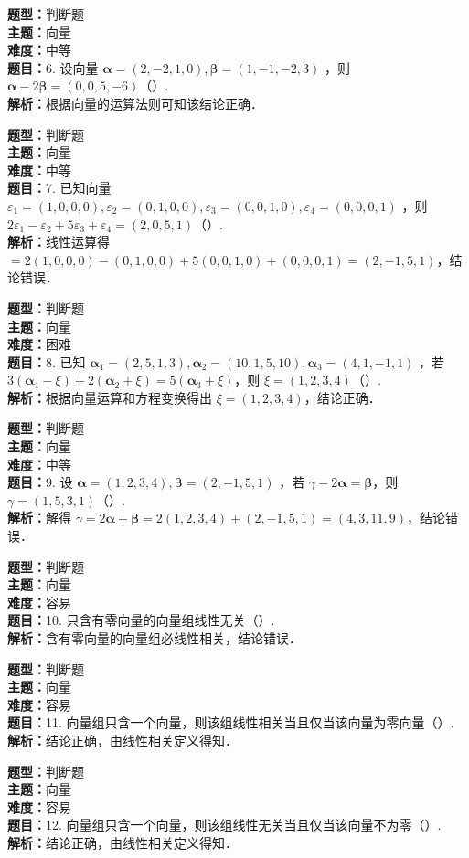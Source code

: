 \documentclass{ctexart}
\newenvironment{question}[5]{%
	\noindent\textbf{题型：}#1\\
	\textbf{主题：}#2\\
	\textbf{难度：}#3\\
	\textbf{题目：}#4\\
	\textbf{解析：}#5\\
	\vspace{1em}
}{}
\begin{document}
	\begin{question}
		{判断题}
		{向量}
		{中等}
		{6. 设向量 \(\boldsymbol{\alpha}=(2,-2,1,0), \boldsymbol{\beta}=(1,-1,-2,3)\) ，则 \(\boldsymbol{\alpha}-2 \boldsymbol{\beta}=(0,0,5,-6)\)（）. }
		{根据向量的运算法则可知该结论正确．}
	\end{question}
	
	\begin{question}
		{判断题}
		{向量}
		{中等}
		{7. 已知向量 \(\varepsilon_1=(1,0,0,0), \varepsilon_2=(0,1,0,0), \varepsilon_3=(0,0,1,0), \varepsilon_4=(0,0,0,1)\) ，则 \(2\varepsilon_1-\varepsilon_2+5\varepsilon_3+\varepsilon_4=(2,0,5,1)\)（）. }
		{线性运算得 \(=2(1,0,0,0)-(0,1,0,0)+5(0,0,1,0)+(0,0,0,1)=(2,-1,5,1)\)，结论错误．}
	\end{question}
	
	\begin{question}
		{判断题}
		{向量}
		{困难}
		{8. 已知 \(\boldsymbol{\alpha}_1=(2,5,1,3), \boldsymbol{\alpha}_2=(10,1,5,10), \boldsymbol{\alpha}_3=(4,1,-1,1)\) ，若 \(3(\boldsymbol{\alpha}_1-\xi)+2(\boldsymbol{\alpha}_2+\xi)=5(\boldsymbol{\alpha}_3+\xi)\)，则 \(\xi=(1,2,3,4)\)（）. }
		{根据向量运算和方程变换得出 \(\xi=(1,2,3,4)\)，结论正确．}
	\end{question}
	
	\begin{question}
		{判断题}
		{向量}
		{中等}
		{9. 设 \(\boldsymbol{\alpha}=(1,2,3,4), \boldsymbol{\beta}=(2,-1,5,1)\) ，若 \(\gamma-2\boldsymbol{\alpha}=\boldsymbol{\beta}\)，则 \(\gamma=(1,5,3,1)\)（）. }
		{解得 \(\gamma=2\boldsymbol{\alpha}+\boldsymbol{\beta}=2(1,2,3,4)+(2,-1,5,1)=(4,3,11,9)\)，结论错误．}
	\end{question}
	
	\begin{question}
		{判断题}
		{向量}
		{容易}
		{10. 只含有零向量的向量组线性无关（）. }
		{含有零向量的向量组必线性相关，结论错误．}
	\end{question}
	
	\begin{question}
		{判断题}
		{向量}
		{容易}
		{11. 向量组只含一个向量，则该组线性相关当且仅当该向量为零向量（）. }
		{结论正确，由线性相关定义得知．}
	\end{question}
	
	\begin{question}
		{判断题}
		{向量}
		{容易}
		{12. 向量组只含一个向量，则该组线性无关当且仅当该向量不为零（）. }
		{结论正确，由线性相关定义得知．}
	\end{question}
	
\end{document}
